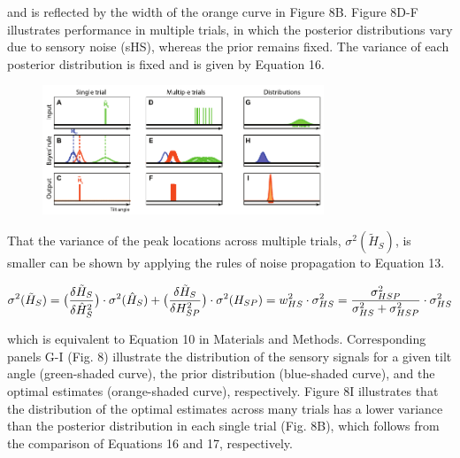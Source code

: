 and is reflected by the width of the orange curve in Figure 8B. Figure 8D-F illustrates performance in multiple trials, in which the posterior distributions vary due to sensory noise (sHS), whereas the prior remains fixed. The variance of each posterior distribution is fixed and is given by Equation 16. 

\begin{figure}
    \includegraphics[width=0.75\textwidth]{src/paper1/figure8.pdf}
\end{figure}

That the variance of the peak locations across multiple trials, $\sigma^2(\tilde{H}_S)$, is smaller can be shown by applying the rules of noise propagation to Equation 13. 

\begin{equation}
\label{p1eqn17}
\sigma^2(\tilde{H}_S) = \\
	\big( \frac{\delta\tilde{H}_S}{\delta\hat{H}_S^2} \big) \cdot \\
	\sigma^2(\hat{H}_S) + \\
	\big( \frac{\delta\tilde{H}_S}{\delta H_{SP}^2} \big) \cdot \\
	\sigma^2(H_{SP}) \\
	= w^2_{HS} \cdot \sigma^2_{HS} \\
	= \frac{\sigma^2_{HSP}}{\sigma^2_{HS} + \sigma^2_{HSP}} \cdot \sigma^2_{HS}
\end{equation}

which is equivalent to Equation 10 in Materials and Methods. Corresponding panels G-I (Fig. 8) illustrate the distribution of the sensory signals for a given tilt angle (green-shaded curve), the prior distribution (blue-shaded curve), and the optimal estimates (orange-shaded curve), respectively. Figure 8I illustrates that the distribution of the optimal estimates across many trials has a lower variance than the posterior distribution in each single trial (Fig. 8B), which follows from the comparison of Equations 16 and 17, respectively. 
